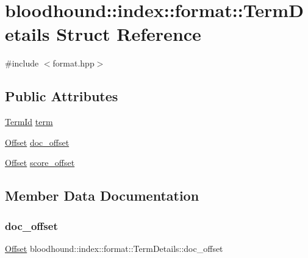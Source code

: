 \hypertarget{structbloodhound_1_1index_1_1format_1_1TermDetails}{}\section{bloodhound\+:\+:index\+:\+:format\+:\+:Term\+Details Struct Reference}
\label{structbloodhound_1_1index_1_1format_1_1TermDetails}


{\ttfamily \#include $<$format.\+hpp$>$}

\subsection*{Public Attributes}
\begin{DoxyCompactItemize}
\item 
\mbox{\hyperlink{structbloodhound_1_1TermId}{Term\+Id}} \mbox{\hyperlink{structbloodhound_1_1index_1_1format_1_1TermDetails_a05890ba855986755276485d7753201ca}{term}}
\item 
\mbox{\hyperlink{structbloodhound_1_1Offset}{Offset}} \mbox{\hyperlink{structbloodhound_1_1index_1_1format_1_1TermDetails_a4361db3ce131c8c7beadf58bd651f1c3}{doc\+\_\+offset}}
\item 
\mbox{\hyperlink{structbloodhound_1_1Offset}{Offset}} \mbox{\hyperlink{structbloodhound_1_1index_1_1format_1_1TermDetails_aec8833fdbf2ae61ade0fe42ce8a7240c}{score\+\_\+offset}}
\end{DoxyCompactItemize}


\subsection{Member Data Documentation}
\mbox{\label{structbloodhound_1_1index_1_1format_1_1TermDetails_a4361db3ce131c8c7beadf58bd651f1c3}} 
\subsubsection{\texorpdfstring{doc\+\_\+offset}{doc\_offset}}
{\footnotesize\ttfamily \mbox{\hyperlink{structbloodhound_1_1Offset}{Offset}} bloodhound\+::index\+::format\+::\+Term\+Details\+::doc\+\_\+offset}

